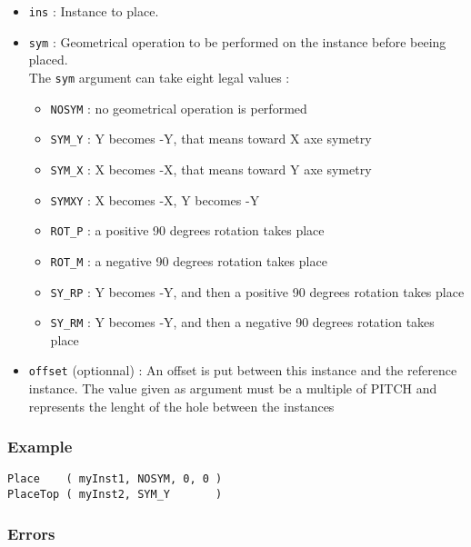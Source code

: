 \begin{itemize}
    \item \verb-ins- : Instance to place.
    \item \verb-sym- : Geometrical operation to be performed on the instance before beeing placed.\\The \verb-sym- argument can take eight legal values :
    \begin{itemize}
        \item \verb-NOSYM- : no geometrical operation is performed
        \item \verb-SYM_Y- : Y becomes -Y, that means toward X axe symetry
        \item \verb-SYM_X- : X becomes -X, that means toward Y axe symetry
        \item \verb-SYMXY- : X becomes -X, Y becomes -Y
        \item \verb-ROT_P- : a positive 90 degrees rotation takes place
        \item \verb-ROT_M- : a negative 90 degrees rotation takes place
        \item \verb-SY_RP- : Y becomes -Y, and then a positive 90 degrees rotation takes place
        \item \verb-SY_RM- : Y becomes -Y, and then a negative 90 degrees rotation takes place
    \end{itemize}
    \item \verb-offset- (optionnal) : An offset is put between this instance and the reference instance. The value given as argument must be a multiple of PITCH and represents the lenght of the hole between the instances
\end{itemize}

\subsubsection{Example}

\begin{verbatim}
Place    ( myInst1, NOSYM, 0, 0 )
PlaceTop ( myInst2, SYM_Y       )
\end{verbatim}

\subsubsection{Errors}
    

